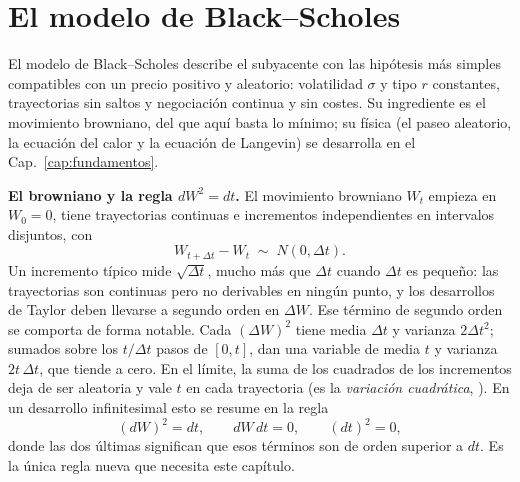 \section{El modelo de Black--Scholes}\label{sec:modelo_bs}

El modelo de Black--Scholes describe el subyacente con las hipótesis más
simples compatibles con un precio positivo y aleatorio: volatilidad
$\sigma$ y tipo $r$ constantes, trayectorias sin saltos y negociación
continua y sin costes. Su ingrediente es el movimiento browniano, del
que aquí basta lo mínimo; su física (el paseo aleatorio, la ecuación del
calor y la ecuación de Langevin) se desarrolla en el
Cap.~\ref{cap:fundamentos}\enprep.

\medskip

\noindent\textbf{El browniano y la regla $dW^2 = dt$.}
El movimiento browniano $W_t$ empieza en $W_0 = 0$, tiene trayectorias
continuas e incrementos independientes en intervalos disjuntos, con
\begin{equation}\label{eq:incremento_browniano}
  W_{t + \Delta t} - W_t \;\sim\; N(0, \Delta t).
\end{equation}
Un incremento típico mide $\sqrt{\Delta t}$, mucho más que $\Delta t$
cuando $\Delta t$ es pequeño: las trayectorias son continuas pero no
derivables en ningún punto, y los desarrollos de Taylor deben llevarse a
segundo orden en $\Delta W$. Ese término de segundo orden se comporta de
forma notable. Cada $(\Delta W)^2$ tiene media $\Delta t$ y varianza
$2\Delta t^2$; sumados sobre los $t/\Delta t$ pasos de $[0, t]$, dan una
variable de media $t$ y varianza $2t\,\Delta t$, que tiende a cero. En
el límite, la suma de los cuadrados de los incrementos deja de ser
aleatoria y vale $t$ en cada trayectoria (es la \emph{variación
cuadrática}, \cite[sec.~3.2.3]{tfgm}). En un desarrollo infinitesimal
esto se resume en la regla
\begin{equation}\label{eq:regla_dW2}
  (dW)^2 = dt, \qquad dW\, dt = 0, \qquad (dt)^2 = 0,
\end{equation}
donde las dos últimas significan que esos términos son de orden
superior a $dt$. Es la única regla nueva que necesita este capítulo.

\medskip

